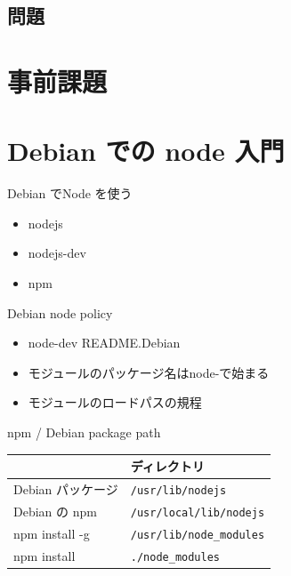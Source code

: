 \subsection{問題}


\section{事前課題}
{\footnotesize
 
}


\section{Debian での node 入門}

\begin{frame}{Debian でNode を使う}
\begin{itemize}
 \item nodejs
 \item nodejs-dev
 \item npm
\end{itemize}
\end{frame}

\begin{frame}{Debian node policy}
 \begin{itemize}
  \item node-dev README.Debian
  \item モジュールのパッケージ名はnode-で始まる
  \item モジュールのロードパスの規程
 \end{itemize}
\end{frame}

\begin{frame}{npm / Debian package path}
\begin{table}[h]
\begin{center}
 \begin{tabular}{|l|l|}
 \hline
 & ディレクトリ\\
 \hline
 Debian パッケージ & \texttt{/usr/lib/nodejs} \\
 Debian の npm  & \texttt{/usr/local/lib/nodejs}\\
 npm install -g & \texttt{/usr/lib/node\_{}modules} \\
 npm install & \texttt{./node\_{}modules} \\
 \hline
 \end{tabular} 
\end{center}
\end{table}
\end{frame}

